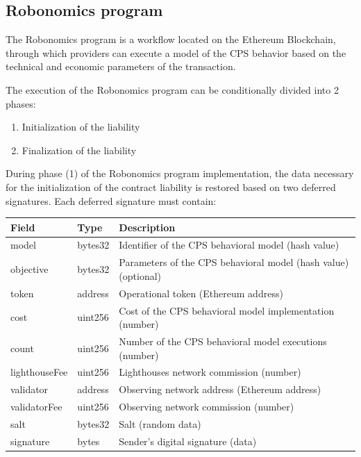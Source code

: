 \documentclass{article}
\begin{document}
\subsection{Robonomics program}

The Robonomics program is a workflow located on the Ethereum Blockchain, through which providers can execute a model of the CPS behavior based on the technical and economic parameters of the transaction.

The execution of the Robonomics program can be conditionally divided into 2 phases:

\begin{enumerate}
	\item Initialization of the liability
	\item Finalization of the liability
\end{enumerate}

During phase (1) of the Robonomics program implementation, the data necessary for the initialization of the contract liability is restored based on two deferred signatures. Each deferred signature must contain:
\newline
\newline

\begin{tabular}{ |l |l |l }
 \textbf{Field} & \textbf{Type} & \textbf{Description} \\ 
 \hline
 model & bytes32 & Identifier of the CPS behavioral model (hash value) \\  
 objective & bytes32 & Parameters of the CPS behavioral model (hash value) (optional) \\
 token & address & Operational token (Ethereum address) \\
 cost & uint256 & Cost of the CPS behavioral model implementation (number) \\
 count & uint256 & Number of the CPS behavioral model executions (number) \\
 lighthouseFee & uint256 & Lighthouses network commission (number) \\
 validator & address & Observing network address (Ethereum address) \\
 validatorFee & uint256 & Observing network commission (number) \\
 salt & bytes32 & Salt (random data) \\
 signature & bytes & Sender’s digital signature (data) \\
\end{tabular}
\end{document}
